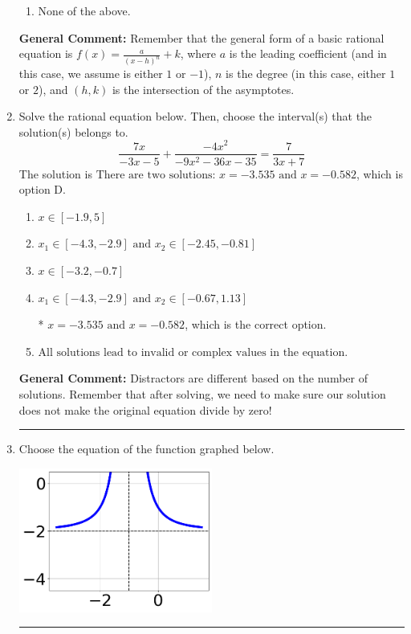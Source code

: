 \documentclass{extbook}[14pt]
\newcommand{\litem}[1]{\item #1

\rule{\textwidth}{0.4pt}}
\begin{document}
\begin{enumerate}
{\begin{enumerate}[label=\Alph*.]
\begin{multicols}{2}
\end{multicols}\item None of the above.\end{enumerate}
\textbf{General Comment:} Remember that the general form of a basic rational equation is $ f(x) = \frac{a}{(x-h)^n} + k$, where $a$ is the leading coefficient (and in this case, we assume is either $1$ or $-1$), $n$ is the degree (in this case, either $1$ or $2$), and $(h, k)$ is the intersection of the asymptotes.
}
\litem{
Solve the rational equation below. Then, choose the interval(s) that the solution(s) belongs to.
\[ \frac{7x}{-3x -5} + \frac{-4x^{2}}{-9x^{2} -36 x -35} = \frac{7}{3x + 7} \]The solution is \( \text{There are two solutions: } x = -3.535 \text{ and } x = -0.582 \), which is option D.\begin{enumerate}[label=\Alph*.]
\item \( x \in [-1.9,5] \)


\item \( x_1 \in [-4.3, -2.9] \text{ and } x_2 \in [-2.45,-0.81] \)


\item \( x \in [-3.2,-0.7] \)


\item \( x_1 \in [-4.3, -2.9] \text{ and } x_2 \in [-0.67,1.13] \)

* $x = -3.535 \text{ and } x = -0.582$, which is the correct option.
\item \( \text{All solutions lead to invalid or complex values in the equation.} \)


\end{enumerate}

\textbf{General Comment:} Distractors are different based on the number of solutions. Remember that after solving, we need to make sure our solution does not make the original equation divide by zero!
}
\litem{
Choose the equation of the function graphed below.

\begin{center}
    \includegraphics[width=0.5\textwidth]{../Figures/rationalGraphToEquationC.png}
\end{center}


}
\end{enumerate}
\end{document}
